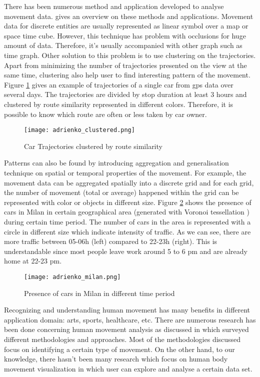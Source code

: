There has been numerous method and application developed to analyse movement data. \cite{adrienko} gives an overview on these methods and applications. Movement data for discrete entities are usually represented as linear symbol over a map or space time cube. However, this technique has problem with occlusions for huge amount of data. Therefore, it's usually accompanied with other graph such as time graph. Other solution to this problem is to use clustering on the trajectories. Apart from minimizing the number of trajectories presented on the view at the same time, clustering also help user to find interesting pattern of the movement. Figure \ref{car_trajectory} \cite{adrienko_book} gives an example of trajectories of a single car from gps data over several days. The trajectories are divided by stop duration at least 3 hours and clustered by route similarity represented in different colors. Therefore, it is possible to know which route are often or less taken by car owner.

\begin{figure}
\centering
\texttt{[image: adrienko\_clustered.png]}
\caption{Car Trajectories clustered by route similarity}
\label{car_trajectory}
\end{figure}

Patterns can also be found by introducing aggregation and generalisation technique on spatial or temporal properties of the movement. For example, the movement data can be aggregated spatially into a discrete grid and for each grid, the number of movement (total or average) happened within the grid can be represented with color or objects in different size. Figure \ref{car_milan} \cite{adrienko_book} shows the presence of cars in Milan in certain geographical area (generated with Voronoi tessellation \cite{okabe}) during certain time period. The number of cars in the area is represented with a circle in different size which indicate intensity of traffic. As we can see, there are more traffic between 05-06h (left) compared to 22-23h (right). This is understandable since most people leave work around 5  to 6 pm and are already home at 22-23 pm.

\begin{figure}
\centering
\texttt{[image: adrienko\_milan.png]}
\caption{Presence of cars in Milan in different time period}
\label{car_milan}
\end{figure}

Recognizing and understanding human movement has many benefits in different application domain: arts\cite{heryadi,raptis}, sports\cite{bernard2013}, healthcare\cite{patsadu}, etc. There are numerous research has been done concerning human movement analysis as discussed in  \cite{gavrila} which surveyed different methodologies and approaches. Most of the methodologies discussed focus on identifying a certain type of movement. On the other hand, to our knowledge, there hasn't been many research which focus on human body movement visualization in which user can explore and analyse a certain data set. 

